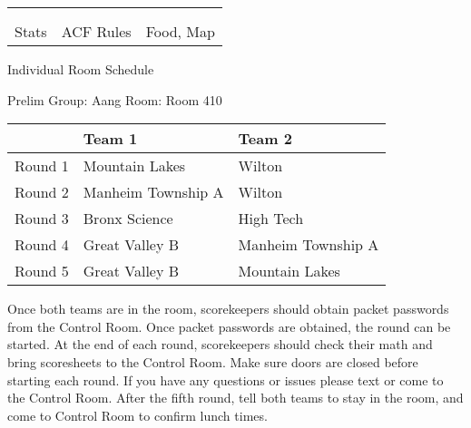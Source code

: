 \documentclass{article}%
\begin{document}
\vspace*{30pt}%
\newline%
%
\begin{tabularx}{\textwidth}{YYY}%
  &  &  \\%
\\%
Stats&ACF Rules&Food, Map\\%
\end{tabularx}%
\newpage%
\begin{center}%
\begin{Huge}%
Individual Room Schedule%
\end{Huge}%
\vspace*{16pt}%
\linebreak%
\begin{Large}%
Prelim Group: Aang \hfill Room: Room 410%
\end{Large}%
\end{center}%
%
\begin{tabularx}{\textwidth}{|c|Y|Y|}%
\hline%
&Team 1&Team 2\\%
\hline%
Round 1&Mountain Lakes&Wilton\\%
Round 2&Manheim Township A&Wilton\\%
Round 3&Bronx Science&High Tech\\%
Round 4&Great Valley B&Manheim Township A\\%
Round 5&Great Valley B&Mountain Lakes\\%
\hline%
\end{tabularx}%
\vspace*{16pt}%
\linebreak%
Once both teams are in the room, scorekeepers should obtain packet passwords from the Control Room. Once packet passwords are obtained, the round can be started. At the end of each round, scorekeepers should check their math and bring scoresheets to the Control Room.\newline%
\newline%
Make sure doors are closed before starting each round. If you have any questions or issues please text or come to the Control Room.\newline%
\newline%
After the fifth round, tell both teams to stay in the room, and come to Control Room to confirm lunch times.\newline%
\end{document}
